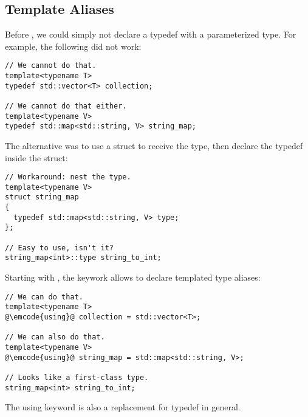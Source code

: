 \subsection{Template Aliases}

Before , we could simply not declare a typedef with a
parameterized type. For example, the following did not work:

\begin{lstlisting}
// We cannot do that.
template<typename T>
typedef std::vector<T> collection;

// We cannot do that either.
template<typename V>
typedef std::map<std::string, V> string_map;
\end{lstlisting}

The alternative was to use a struct to receive the type, then declare
the typedef inside the struct:

\begin{lstlisting}
// Workaround: nest the type.
template<typename V>
struct string_map
{
  typedef std::map<std::string, V> type;
};

// Easy to use, isn't it?
string_map<int>::type string_to_int;
\end{lstlisting}

Starting with , the  keywork allows to declare
templated type aliases:

\begin{lstlisting}
// We can do that.
template<typename T>
@\emcode{using}@ collection = std::vector<T>;

// We can also do that.
template<typename V>
@\emcode{using}@ string_map = std::map<std::string, V>;

// Looks like a first-class type.
string_map<int> string_to_int;
\end{lstlisting}

The using keyword is also a replacement for typedef in general.

